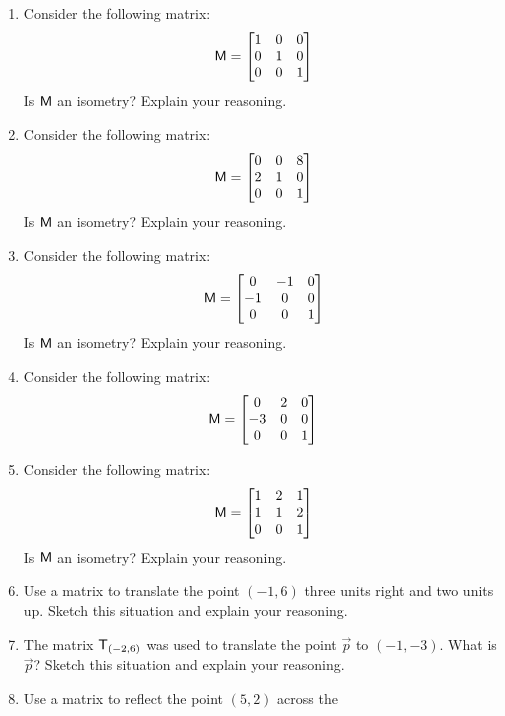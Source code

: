 \begin{enumerate}
\item Consider the following matrix:
\[
\mathsf{M} = 
\begin{bmatrix}
1 & 0 & 0\\
0 & 1 & 0\\
0 & 0 & 1
\end{bmatrix}
\]
Is $\mathsf{M}$ an isometry? Explain your reasoning.
\item Consider the following matrix:
\[
\mathsf{M} = 
\begin{bmatrix}
0 & 0 & 8\\
2 & 1 & 0\\
0 & 0 & 1
\end{bmatrix}
\]
Is $\mathsf{M}$ an isometry? Explain your reasoning.
\item Consider the following matrix:
\[
\mathsf{M} = 
\begin{bmatrix}
0  & -1  & 0\\
-1 & 0  & 0\\
0  & 0  & 1
\end{bmatrix}
\]
Is $\mathsf{M}$ an isometry? Explain your reasoning.
\item Consider the following matrix:
\[
\mathsf{M} = 
\begin{bmatrix}
0  & 2  & 0\\
-3 & 0  & 0\\
0  & 0  & 1
\end{bmatrix}
\]
\item Consider the following matrix:
\[
\mathsf{M} = 
\begin{bmatrix}
1  & 2  & 1\\
1 & 1  & 2\\
0  & 0  & 1
\end{bmatrix}
\]
Is $\mathsf{M}$ an isometry? Explain your reasoning.
\item Use a matrix to translate the point $(-1,6)$ three units right
  and two units up. Sketch this situation and explain your reasoning.
\item The matrix $\mathsf{T}_{(-2,6)}$ was used to translate the point
  $\vec{p}$ to $(-1,-3)$.  What is $\vec{p}$? Sketch this situation
  and explain your reasoning.
\item Use a matrix to reflect the point $(5,2)$ across the

\end{enumerate}
